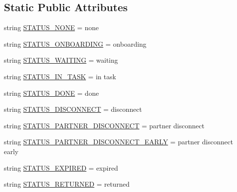 \subsection*{Static Public Attributes}
\begin{DoxyCompactItemize}
\item 
string \hyperlink{classparlai_1_1mturk_1_1core_1_1agents_1_1AssignState_ac947c4fee13881e6ecd8451bdf098485}{S\+T\+A\+T\+U\+S\+\_\+\+N\+O\+NE} = \textquotesingle{}none\textquotesingle{}
\item 
string \hyperlink{classparlai_1_1mturk_1_1core_1_1agents_1_1AssignState_a49d2be98face46c46e4159243ccaf04a}{S\+T\+A\+T\+U\+S\+\_\+\+O\+N\+B\+O\+A\+R\+D\+I\+NG} = \textquotesingle{}onboarding\textquotesingle{}
\item 
string \hyperlink{classparlai_1_1mturk_1_1core_1_1agents_1_1AssignState_aabbbd889d7189a6d858727dca3f72a9d}{S\+T\+A\+T\+U\+S\+\_\+\+W\+A\+I\+T\+I\+NG} = \textquotesingle{}waiting\textquotesingle{}
\item 
string \hyperlink{classparlai_1_1mturk_1_1core_1_1agents_1_1AssignState_a01bc536c6ffa8629ef343c8b5f69a22a}{S\+T\+A\+T\+U\+S\+\_\+\+I\+N\+\_\+\+T\+A\+SK} = \textquotesingle{}in task\textquotesingle{}
\item 
string \hyperlink{classparlai_1_1mturk_1_1core_1_1agents_1_1AssignState_a13ac505cad1e67ccaee03cde2a98841f}{S\+T\+A\+T\+U\+S\+\_\+\+D\+O\+NE} = \textquotesingle{}done\textquotesingle{}
\item 
string \hyperlink{classparlai_1_1mturk_1_1core_1_1agents_1_1AssignState_a7a16ee88b20628d6080afa2b879a3304}{S\+T\+A\+T\+U\+S\+\_\+\+D\+I\+S\+C\+O\+N\+N\+E\+CT} = \textquotesingle{}disconnect\textquotesingle{}
\item 
string \hyperlink{classparlai_1_1mturk_1_1core_1_1agents_1_1AssignState_a40bffac556fb62243872a69d8ec52700}{S\+T\+A\+T\+U\+S\+\_\+\+P\+A\+R\+T\+N\+E\+R\+\_\+\+D\+I\+S\+C\+O\+N\+N\+E\+CT} = \textquotesingle{}partner disconnect\textquotesingle{}
\item 
string \hyperlink{classparlai_1_1mturk_1_1core_1_1agents_1_1AssignState_ac62ca437e5cf0da61cb4e26de3913198}{S\+T\+A\+T\+U\+S\+\_\+\+P\+A\+R\+T\+N\+E\+R\+\_\+\+D\+I\+S\+C\+O\+N\+N\+E\+C\+T\+\_\+\+E\+A\+R\+LY} = \textquotesingle{}partner disconnect early\textquotesingle{}
\item 
string \hyperlink{classparlai_1_1mturk_1_1core_1_1agents_1_1AssignState_ab6e92544f1357440c879cda2a2df9b82}{S\+T\+A\+T\+U\+S\+\_\+\+E\+X\+P\+I\+R\+ED} = \textquotesingle{}expired\textquotesingle{}
\item 
string \hyperlink{classparlai_1_1mturk_1_1core_1_1agents_1_1AssignState_a0d0bdd6ec3b881635fc9ed3283903f7a}{S\+T\+A\+T\+U\+S\+\_\+\+R\+E\+T\+U\+R\+N\+ED} = \textquotesingle{}returned\textquotesingle{}
\end{DoxyCompactItemize}


